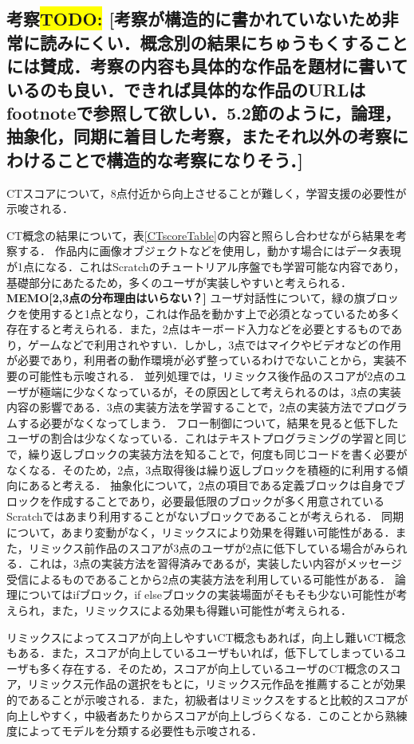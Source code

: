 \documentclass[submit,techrep,noauthor]{ipsj}
\newcommand{\todo}[1]{\colorbox{yellow}{{\bf TODO}:}{\color{red} {\textbf{[#1]}}}}
\newcommand{\memo}[1]{\colorbox{magenta!30}{\textbf{MEMO}}{\color{red!50}\textbf{[#1]}}}
\begin{document}
\subsection{考察\todo{考察が構造的に書かれていないため非常に読みにくい．概念別の結果にちゅうもくすることには賛成．考察の内容も具体的な作品を題材に書いているのも良い．できれば具体的な作品のURLはfootnoteで参照して欲しい．5.2節のように，論理，抽象化，同期に着目した考察，またそれ以外の考察にわけることで構造的な考察になりそう．}}

CTスコアについて，8点付近から向上させることが難しく，学習支援の必要性が示唆される．

CT概念の結果について，表\ref{CTscoreTable}の内容と照らし合わせながら結果を考察する．
作品内に画像オブジェクトなどを使用し，動かす場合にはデータ表現が1点になる．これはScratchのチュートリアル序盤でも学習可能な内容であり，基礎部分にあたるため，多くのユーザが実装しやすいと考えられる．\memo{2,3点の分布理由はいらない？}
ユーザ対話性について，緑の旗ブロックを使用すると1点となり，これは作品を動かす上で必須となっているため多く存在すると考えられる．また，2点はキーボード入力などを必要とするものであり，ゲームなどで利用されやすい．しかし，3点ではマイクやビデオなどの作用が必要であり，利用者の動作環境が必ず整っているわけでないことから，実装不要の可能性も示唆される．
並列処理では，リミックス後作品のスコアが2点のユーザが極端に少なくなっているが，その原因として考えられるのは，3点の実装内容の影響である．3点の実装方法を学習することで，2点の実装方法でプログラムする必要がなくなってしまう．
フロー制御について，結果を見ると低下したユーザの割合は少なくなっている．これはテキストプログラミングの学習と同じで，繰り返しブロックの実装方法を知ることで，何度も同じコードを書く必要がなくなる．そのため，2点，3点取得後は繰り返しブロックを積極的に利用する傾向にあると考える．
抽象化について，2点の項目である定義ブロックは自身でブロックを作成することであり，必要最低限のブロックが多く用意されているScratchではあまり利用することがないブロックであることが考えられる．
同期について，あまり変動がなく，リミックスにより効果を得難い可能性がある．また，リミックス前作品のスコアが3点のユーザが2点に低下している場合がみられる．これは，3点の実装方法を習得済みであるが，実装したい内容がメッセージ受信によるものであることから2点の実装方法を利用している可能性がある．
論理についてはifブロック，if elseブロックの実装場面がそもそも少ない可能性が考えられ，また，リミックスによる効果も得難い可能性が考えられる．

リミックスによってスコアが向上しやすいCT概念もあれば，向上し難いCT概念もある．また，スコアが向上しているユーザもいれば，低下してしまっているユーザも多く存在する．そのため，スコアが向上しているユーザのCT概念のスコア，リミックス元作品の選択をもとに，リミックス元作品を推薦することが効果的であることが示唆される．また，初級者はリミックスをすると比較的スコアが向上しやすく，中級者あたりからスコアが向上しづらくなる．このことから熟練度によってモデルを分類する必要性も示唆される．
\end{document}
